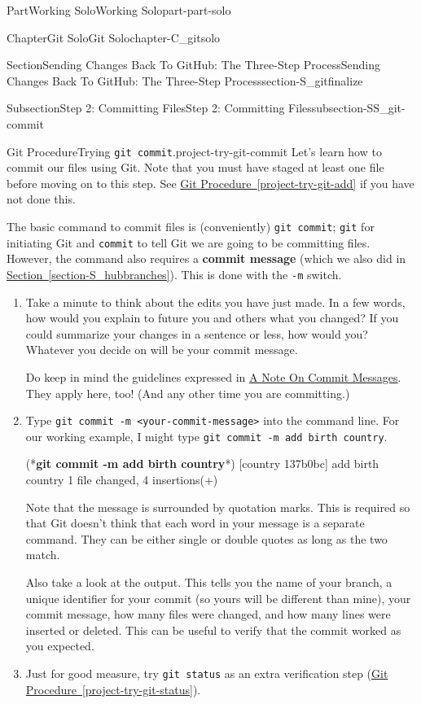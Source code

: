 \documentclass[oneside,10pt,]{book}
\newcommand{\xreffont}{\relax}
\newcommand{\mono}[1]{\texttt{#1}}
\newcommand{\terminology}[1]{\textbf{#1}}
\newcommand{\consoleinput}[1]{\textbf{#1}}
\begin{document}
\begin{partptx}{Part}{Working Solo}{}{Working Solo}{}{}{part-part-solo}
\begin{chapterptx}{Chapter}{Git Solo}{}{Git Solo}{}{}{chapter-C_gitsolo}
\begin{sectionptx}{Section}{Sending Changes Back To GitHub: The Three-Step Process}{}{Sending Changes Back To GitHub: The Three-Step Process}{}{}{section-S_gitfinalize}
\begin{subsectionptx}{Subsection}{Step 2: Committing Files}{}{Step 2: Committing Files}{}{}{subsection-SS_git-commit}
\begin{project}{Git Procedure}{Trying \mono{git commit}.}{project-try-git-commit}%
Let's learn how to commit our files using Git. Note that you must have staged at least one file before moving on to this step. See \hyperref[project-try-git-add]{Git Procedure~{\xreffont\ref{project-try-git-add}}} if you have not done this.%
\par
The basic command to commit files is (conveniently) \mono{git commit}; \mono{git} for initiating Git and \mono{commit} to tell Git we are going to be committing files. However, the command also requires a \terminology{commit message} (which we also did in \hyperref[section-S_hubbranches]{Section~{\xreffont\ref{section-S_hubbranches}}}). This is done with the \mono{-m} switch.%
\begin{enumerate}[font=\bfseries,label=(\alph*),ref=\alph*]%
\item{}Take a minute to think about the edits you have just made. In a few words, how would you explain to future you and others what you changed? If you could summarize your changes in a sentence or less, how would you? Whatever you decide on will be your commit message.%
\par
Do keep in mind the guidelines expressed in \hyperref[assemblage-commitmessages]{A Note On Commit Messages}. They apply here, too! (And any other time you are committing.)%
\item{}Type \mono{git commit -m \textquotedbl{}<your-commit-message>\textquotedbl{}} into the command line. For our working example, I might type \mono{git commit -m \textquotedbl{}add birth country\textquotedbl{}}.%
\begin{console}{0}{1}{0}
(*\consoleinput{git commit -m \textquotedbl{}add birth country\textquotedbl{}}*)
[country 137b0bc] add birth country
 1 file changed, 4 insertions(+)
\end{console}
Note that the message is surrounded by quotation marks. This is required so that Git doesn't think that each word in your message is a separate command. They can be either single or double quotes as long as the two match.%
\par
Also take a look at the output. This tells you the name of your branch, a unique identifier for your commit (so yours will be different than mine), your commit message, how many files were changed, and how many lines were inserted or deleted. This can be useful to verify that the commit worked as you expected.%
\item{}Just for good measure, try \mono{git status} as an extra verification step (\hyperref[project-try-git-status]{Git Procedure~{\xreffont\ref{project-try-git-status}}}).%

\end{enumerate}
\end{project}
\end{subsectionptx}
\end{sectionptx}
\end{chapterptx}
\end{partptx}
\end{document}
